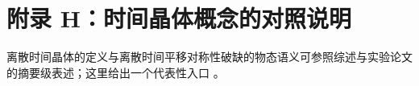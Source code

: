 \section{附录 H：时间晶体概念的对照说明}

离散时间晶体的定义与离散时间平移对称性破缺的物态语义可参照综述与实验论文的摘要级表述；这里给出一个代表性入口 \cite{NaturePhysicsTimeCrystal}。

